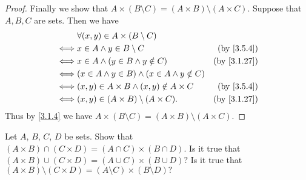 \begin{proof}
  Finally we show that \(A \times (B \setminus C) = (A \times B) \setminus (A \times C)\).
  Suppose that \(A, B, C\) are sets.
  Then we have
  \begin{align*}
         & \forall (x, y) \in A \times (B \setminus C)                                          \\
    \iff & x \in A \land y \in B \setminus C                        & \text{(by \cref{3.5.4})}  \\
    \iff & x \in A \land (y \in B \land y \notin C)                 & \text{(by \cref{3.1.27})} \\
    \iff & (x \in A \land y \in B) \land (x \in A \land y \notin C)                             \\
    \iff & (x, y) \in A \times B \land (x, y) \notin A \times C     & \text{(by \cref{3.5.4})}  \\
    \iff & (x, y) \in (A \times B) \setminus (A \times C).          & \text{(by \cref{3.1.27})}
  \end{align*}
  Thus by \cref{3.1.4} we have \(A \times (B \setminus C) = (A \times B) \setminus (A \times C)\).
\end{proof}

\begin{exercise}\label{ex 3.5.5}
  Let \(A\), \(B\), \(C\), \(D\) be sets.
  Show that \((A \times B) \cap (C \times D) = (A \cap C) \times (B \cap D)\).
  Is it true that \((A \times B) \cup (C \times D) = (A \cup C) \times (B \cup D)?\)
  Is it true that \((A \times B) \setminus (C \times D) = (A \setminus C) \times (B \setminus D)?\)
\end{exercise}


